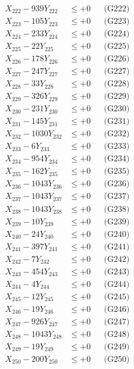 \documentclass[a4paper,10pt]{article}
\begin{document}
{\begin{align}
X_{222} - 939Y_{222} &\leq +0 && \text{(G222)} \\
X_{223} - 105Y_{223} &\leq +0 && \text{(G223)} \\
X_{224} - 233Y_{224} &\leq +0 && \text{(G224)} \\
X_{225} - 22Y_{225} &\leq +0 && \text{(G225)} \\
X_{226} - 178Y_{226} &\leq +0 && \text{(G226)} \\
X_{227} - 247Y_{227} &\leq +0 && \text{(G227)} \\
X_{228} - 33Y_{228} &\leq +0 && \text{(G228)} \\
X_{229} - 326Y_{229} &\leq +0 && \text{(G229)} \\
X_{230} - 231Y_{230} &\leq +0 && \text{(G230)} \\
\allowbreak
X_{231} - 145Y_{231} &\leq +0 && \text{(G231)} \\
X_{232} - 1030Y_{232} &\leq +0 && \text{(G232)} \\
X_{233} - 6Y_{233} &\leq +0 && \text{(G233)} \\
X_{234} - 954Y_{234} &\leq +0 && \text{(G234)} \\
X_{235} - 162Y_{235} &\leq +0 && \text{(G235)} \\
X_{236} - 1043Y_{236} &\leq +0 && \text{(G236)} \\
X_{237} - 1043Y_{237} &\leq +0 && \text{(G237)} \\
X_{238} - 1043Y_{238} &\leq +0 && \text{(G238)} \\
X_{239} - 10Y_{239} &\leq +0 && \text{(G239)} \\
X_{240} - 24Y_{240} &\leq +0 && \text{(G240)} \\
\allowbreak
X_{241} - 397Y_{241} &\leq +0 && \text{(G241)} \\
X_{242} - 7Y_{242} &\leq +0 && \text{(G242)} \\
X_{243} - 454Y_{243} &\leq +0 && \text{(G243)} \\
X_{244} - 4Y_{244} &\leq +0 && \text{(G244)} \\
X_{245} - 12Y_{245} &\leq +0 && \text{(G245)} \\
X_{246} - 19Y_{246} &\leq +0 && \text{(G246)} \\
X_{247} - 926Y_{247} &\leq +0 && \text{(G247)} \\
X_{248} - 1043Y_{248} &\leq +0 && \text{(G248)} \\
X_{249} - 19Y_{249} &\leq +0 && \text{(G249)} \\
X_{250} - 200Y_{250} &\leq +0 && \text{(G250)} \\

\end{align}}
\end{document}

